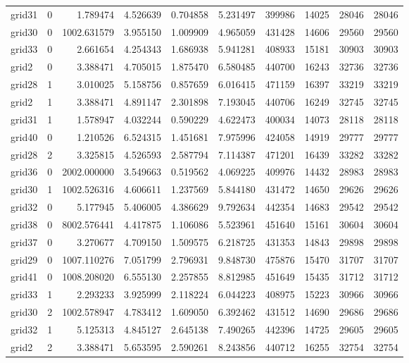 \begin{longtable}{|l|r|r|r|r|r|r|r|r|r|}
grid31 & 0 & 1.789474 & 4.526639 & 0.704858 & 5.231497 & 399986 & 14025 & 28046 & 28046 \\
grid30 & 0 & 1002.631579 & 3.955150 & 1.009909 & 4.965059 & 431428 & 14606 & 29560 & 29560 \\
grid33 & 0 & 2.661654 & 4.254343 & 1.686938 & 5.941281 & 408933 & 15181 & 30903 & 30903 \\
grid2 & 0 & 3.388471 & 4.705015 & 1.875470 & 6.580485 & 440700 & 16243 & 32736 & 32736 \\
grid28 & 1 & 3.010025 & 5.158756 & 0.857659 & 6.016415 & 471159 & 16397 & 33219 & 33219 \\
grid2 & 1 & 3.388471 & 4.891147 & 2.301898 & 7.193045 & 440706 & 16249 & 32745 & 32745 \\
grid31 & 1 & 1.578947 & 4.032244 & 0.590229 & 4.622473 & 400034 & 14073 & 28118 & 28118 \\
grid40 & 0 & 1.210526 & 6.524315 & 1.451681 & 7.975996 & 424058 & 14919 & 29777 & 29777 \\
grid28 & 2 & 3.325815 & 4.526593 & 2.587794 & 7.114387 & 471201 & 16439 & 33282 & 33282 \\
grid36 & 0 & 2002.000000 & 3.549663 & 0.519562 & 4.069225 & 409976 & 14432 & 28983 & 28983 \\
grid30 & 1 & 1002.526316 & 4.606611 & 1.237569 & 5.844180 & 431472 & 14650 & 29626 & 29626 \\
grid32 & 0 & 5.177945 & 5.406005 & 4.386629 & 9.792634 & 442354 & 14683 & 29542 & 29542 \\
grid38 & 0 & 8002.576441 & 4.417875 & 1.106086 & 5.523961 & 451640 & 15161 & 30604 & 30604 \\
grid37 & 0 & 3.270677 & 4.709150 & 1.509575 & 6.218725 & 431353 & 14843 & 29898 & 29898 \\
grid29 & 0 & 1007.110276 & 7.051799 & 2.796931 & 9.848730 & 475876 & 15470 & 31707 & 31707 \\
grid41 & 0 & 1008.208020 & 6.555130 & 2.257855 & 8.812985 & 451649 & 15435 & 31712 & 31712 \\
grid33 & 1 & 2.293233 & 3.925999 & 2.118224 & 6.044223 & 408975 & 15223 & 30966 & 30966 \\
grid30 & 2 & 1002.578947 & 4.783412 & 1.609050 & 6.392462 & 431512 & 14690 & 29686 & 29686 \\
grid32 & 1 & 5.125313 & 4.845127 & 2.645138 & 7.490265 & 442396 & 14725 & 29605 & 29605 \\
grid2 & 2 & 3.388471 & 5.653595 & 2.590261 & 8.243856 & 440712 & 16255 & 32754 & 32754 \\

\end{longtable}
